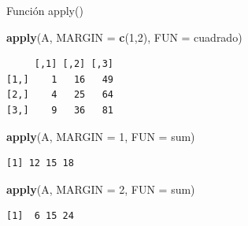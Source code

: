 \documentclass[
  ignorenonframetext,
]{beamer}
\newenvironment{Shaded}{\begin{snugshade}}{\end{snugshade}}
\newcommand{\AttributeTok}[1]{\textcolor[rgb]{0.13,0.29,0.53}{#1}}
\newcommand{\DecValTok}[1]{\textcolor[rgb]{0.00,0.00,0.81}{#1}}
\newcommand{\FunctionTok}[1]{\textcolor[rgb]{0.13,0.29,0.53}{\textbf{#1}}}
\newcommand{\NormalTok}[1]{#1}
\begin{document}
\begin{frame}[fragile]{Función apply()}
\label{funciuxf3n-apply-1}
\begin{Shaded}
\begin{Highlighting}[]
\FunctionTok{apply}\NormalTok{(A, }\AttributeTok{MARGIN =} \FunctionTok{c}\NormalTok{(}\DecValTok{1}\NormalTok{,}\DecValTok{2}\NormalTok{), }\AttributeTok{FUN =}\NormalTok{ cuadrado)}
\end{Highlighting}
\end{Shaded}

\begin{verbatim}
     [,1] [,2] [,3]
[1,]    1   16   49
[2,]    4   25   64
[3,]    9   36   81
\end{verbatim}

\begin{Shaded}
\begin{Highlighting}[]
\FunctionTok{apply}\NormalTok{(A, }\AttributeTok{MARGIN =} \DecValTok{1}\NormalTok{, }\AttributeTok{FUN =}\NormalTok{ sum)}
\end{Highlighting}
\end{Shaded}

\begin{verbatim}
[1] 12 15 18
\end{verbatim}

\begin{Shaded}
\begin{Highlighting}[]
\FunctionTok{apply}\NormalTok{(A, }\AttributeTok{MARGIN =} \DecValTok{2}\NormalTok{, }\AttributeTok{FUN =}\NormalTok{ sum)}
\end{Highlighting}
\end{Shaded}

\begin{verbatim}
[1]  6 15 24
\end{verbatim}
\end{frame}
\end{document}
